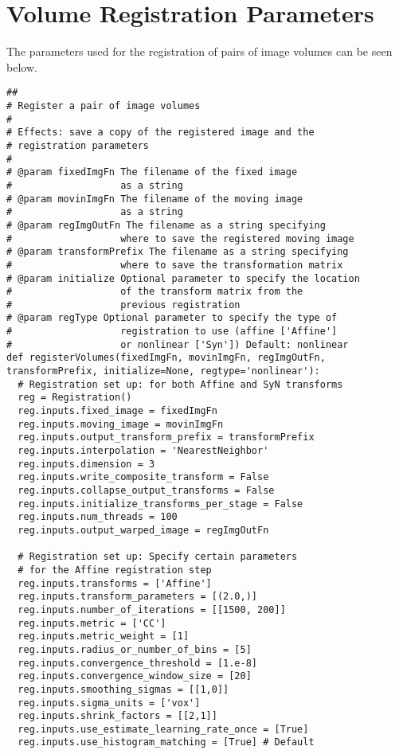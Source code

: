 \chapter{Volume Registration Parameters}
\label{appendix:registration-params}

The parameters used for the registration of pairs of image volumes can be seen below.

\begin{lstlisting}
##
# Register a pair of image volumes
#
# Effects: save a copy of the registered image and the 
# registration parameters
#
# @param fixedImgFn The filename of the fixed image 
#                   as a string
# @param movinImgFn The filename of the moving image
#                   as a string
# @param regImgOutFn The filename as a string specifying
#                   where to save the registered moving image
# @param transformPrefix The filename as a string specifying
#                   where to save the transformation matrix   
# @param initialize Optional parameter to specify the location 
#                   of the transform matrix from the
#                   previous registration
# @param regType Optional parameter to specify the type of
#                   registration to use (affine ['Affine'] 
#                   or nonlinear ['Syn']) Default: nonlinear
def registerVolumes(fixedImgFn, movinImgFn, regImgOutFn,
transformPrefix, initialize=None, regtype='nonlinear'):
  # Registration set up: for both Affine and SyN transforms
  reg = Registration()
  reg.inputs.fixed_image = fixedImgFn
  reg.inputs.moving_image = movinImgFn
  reg.inputs.output_transform_prefix = transformPrefix 
  reg.inputs.interpolation = 'NearestNeighbor'
  reg.inputs.dimension = 3
  reg.inputs.write_composite_transform = False 
  reg.inputs.collapse_output_transforms = False
  reg.inputs.initialize_transforms_per_stage = False
  reg.inputs.num_threads = 100
  reg.inputs.output_warped_image = regImgOutFn

  # Registration set up: Specify certain parameters
  # for the Affine registration step
  reg.inputs.transforms = ['Affine']
  reg.inputs.transform_parameters = [(2.0,)]
  reg.inputs.number_of_iterations = [[1500, 200]] 
  reg.inputs.metric = ['CC'] 
  reg.inputs.metric_weight = [1]
  reg.inputs.radius_or_number_of_bins = [5] 
  reg.inputs.convergence_threshold = [1.e-8]
  reg.inputs.convergence_window_size = [20]
  reg.inputs.smoothing_sigmas = [[1,0]]
  reg.inputs.sigma_units = ['vox']
  reg.inputs.shrink_factors = [[2,1]]
  reg.inputs.use_estimate_learning_rate_once = [True]
  reg.inputs.use_histogram_matching = [True] # Default


\end{lstlisting}

